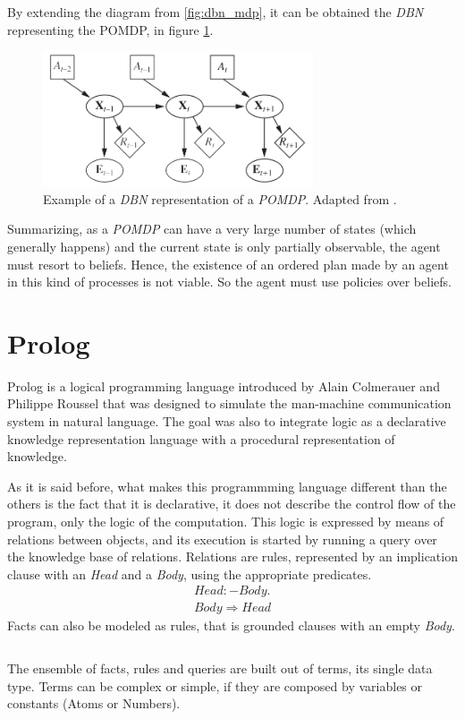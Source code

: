 By extending the diagram from \ref{fig:dbn_mdp}, it can be obtained the \textit{
DBN} representing the POMDP, in figure \ref{fig:dbn_pomdp}.

\begin{figure}[H]
    \centering
        \includegraphics[width=8cm]{images/pomdp-dbn}
        \caption{Example of a \textit{DBN} representation of a
        \textit{POMDP}. Adapted from \cite{Russell2009}.
        }
        \label{fig:dbn_pomdp}
\end{figure}

Summarizing, as a \textit{POMDP} can have a very large number of states (which
generally happens) and the current state is only partially observable, the agent
must resort to beliefs. Hence, the existence of an ordered plan made by an agent
in this kind of processes is not viable. So the agent must use policies over
beliefs.

\section{Prolog}

Prolog is a logical programming language introduced by Alain Colmerauer and
Philippe Roussel \cite{Colmerauer1993,prolog} that was designed to simulate
the man-machine communication system in natural language. The goal was also to
integrate logic as a declarative knowledge representation language with a
procedural representation of knowledge.

As it is said before, what makes this programmming language different than the
others is the fact that it is declarative, it does not describe the control flow
of the program, only the logic of the computation. This logic is expressed by
means of relations between objects, and its execution is started by running a
query over the knowledge base of relations. Relations are rules, represented by
an implication clause with an \textit{Head} and a \textit{Body}, using the
appropriate predicates.
\begin{gather*}
    Head :- Body. \\
    Body \Rightarrow Head
\end{gather*}
Facts can also be modeled as rules, that is grounded clauses with an empty
\textit{Body}.
\begin{center}
\begin{tabular}{c}
    
\end{tabular}
\end{center}
The ensemble of facts, rules and queries are built out of terms, its single data
type. Terms can be complex or simple, if they are composed by variables or
constants (Atoms or Numbers).

